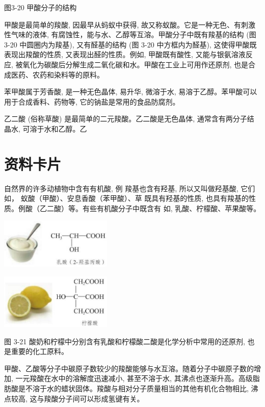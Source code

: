 \documentclass[10pt]{article}
\begin{document}
图3-20 甲酸分子的结构

甲酸是最简单的羧酸, 因最早从蚂蚁中获得, 故又称蚁酸。它是一种无色、有刺激性气味的液体, 有腐蚀性，能与水、乙醇等互溶。甲酸分子中既有羧基的结构 (图 3-20 中圆圈内为羧基), 又有醛基的结构 (图 3-20 中方框内为醛基), 这使得甲酸既表现出羧酸的性质, 又表现出醛的性质。例如, 甲酸既有酸性, 又能与银氨溶液反应, 被氧化为碳酸后分解生成二氧化碳和水。甲酸在工业上可用作还原剂, 也是合成医药、农药和染料等的原料。

苯甲酸属于芳香酸, 是一种无色晶体, 易升华, 微溶于水, 易溶于乙醇。苯甲酸可以用于合成香料、药物等, 它的钠盐是常用的食品防腐剂。

乙二酸 (俗称草酸) 是最简单的二元羧酸。乙二酸是无色晶体, 通常含有两分子结晶水, 可溶于水和乙醇。乙

\section*{资料卡片}

自然界的许多动植物中含有有机酸, 例 羧基也含有羟基, 所以又叫做羟基酸, 它们如， 蚁酸（甲酸）、安息香酸（苯甲酸）、草 既具有羟基的性质, 也具有羧基的性质。例酸（乙二酸）等。有些有机酸分子中既含有 如, 乳酸、柠檬酸、苹果酸等。

\begin{center}
\includegraphics[max width=0.4\textwidth]{images/0190efc5-b58a-7c43-bfb0-e0a030df9cfd_79_237682.jpg}
\end{center}

\begin{center}
\includegraphics[max width=0.4\textwidth]{images/0190efc5-b58a-7c43-bfb0-e0a030df9cfd_79_485056.jpg}
\end{center}

图 3-21 酸奶和柠檬中分别含有乳酸和柠檬酸二酸是化学分析中常用的还原剂, 也是重要的化工原料。

甲酸、乙酸等分子中碳原子数较少的羧酸能够与水互溶。随着分子中碳原子数的增加, 一元羧酸在水中的溶解度迅速减小, 甚至不溶于水, 其沸点也逐渐升高。高级脂肪酸是不溶于水的蜡状固体。羧酸与相对分子质量相当的其他有机化合物相比, 沸点较高, 这与羧酸分子间可以形成氢键有关。
\end{document}
